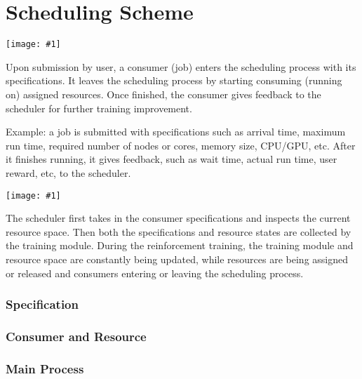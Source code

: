 \documentclass{article}
\theoremstyle{definition}
\theoremstyle{remark}
\newcommand{\addpic}[1]{\texttt{[image: \#1]}}
\begin{document}
\newpage
	
\part{Scheduling Scheme}
	

	
	\addpic{figures/Macro-fix.png} 
	
	
	Upon submission by user, a consumer (job) enters the scheduling process with its specifications. It leaves the scheduling process by starting consuming (running on) assigned resources. Once finished, the consumer gives feedback to the scheduler for further training improvement.
	
	Example: a job is submitted with specifications such as arrival time, maximum run time, required number of nodes or cores, memory size, CPU/GPU, etc. After it finishes running, it gives feedback, such as wait time, actual run time, user reward, etc, to the scheduler.
	
	\addpic{figures/Intro-Scheduler.jpg}
	
	The scheduler first takes in the consumer specifications and inspects the current resource space. Then both the specifications and resource states are collected by the training module. During the reinforcement training, the training module and resource space are constantly being updated, while resources are being assigned or released and consumers entering or leaving the scheduling process.
	

	\section{Specification}
	
	\section{Consumer and Resource}
	
	\section{Main Process}
	
	
	
\end{document}
